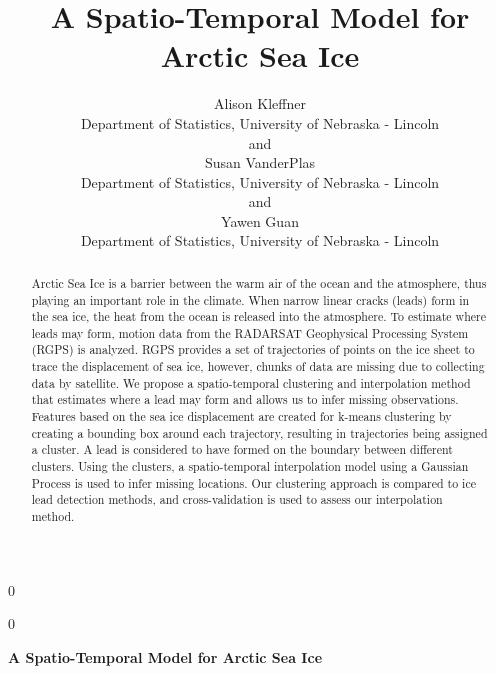 \documentclass[12pt]{article}
\newcommand{\blind}{0}
\begin{document}
\def\spacingset#1{\renewcommand{\baselinestretch}%
{#1}\small\normalsize} \spacingset{1}



\blind
{
  \title{\bf A Spatio-Temporal Model for Arctic Sea Ice}

  \author{
        Alison Kleffner \\
    Department of Statistics, University of Nebraska - Lincoln\\
     and \\     Susan VanderPlas \\
    Department of Statistics, University of Nebraska - Lincoln\\
     and \\     Yawen Guan \\
    Department of Statistics, University of Nebraska - Lincoln\\
      }
  \maketitle
} \fi

\blind
{
  \bigskip
  \bigskip
  \bigskip
  \begin{center}
    {\LARGE\bf A Spatio-Temporal Model for Arctic Sea Ice}
  \end{center}
  \medskip
} \fi

\bigskip
\begin{abstract}
Arctic Sea Ice is a barrier between the warm air of the ocean and the
atmosphere, thus playing an important role in the climate. When narrow
linear cracks (leads) form in the sea ice, the heat from the ocean is
released into the atmosphere. To estimate where leads may form, motion
data from the RADARSAT Geophysical Processing System (RGPS) is analyzed.
RGPS provides a set of trajectories of points on the ice sheet to trace
the displacement of sea ice, however, chunks of data are missing due to
collecting data by satellite. We propose a spatio-temporal clustering
and interpolation method that estimates where a lead may form and allows
us to infer missing observations. Features based on the sea ice
displacement are created for k-means clustering by creating a bounding
box around each trajectory, resulting in trajectories being assigned a
cluster. A lead is considered to have formed on the boundary between
different clusters. Using the clusters, a spatio-temporal interpolation
model using a Gaussian Process is used to infer missing locations. Our
clustering approach is compared to ice lead detection methods, and
cross-validation is used to assess our interpolation method.
\end{abstract}
\end{document}
